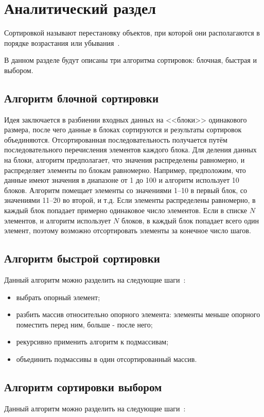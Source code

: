 \chapter{Аналитический раздел}

Сортировкой называют перестановку объектов, при которой они располагаются в порядке возрастания или убывания~\cite{knut}.

В данном разделе будут описаны три алгоритма сортировок: блочная, быстрая и выбором.

\section{Алгоритм блочной сортировки}
Идея заключается в разбиении входных данных на <<блоки>> одинакового размера, после чего данные в блоках сортируются и результаты сортировок объединяются.
Отсортированная последовательность получается путём последовательного перечисления элементов каждого блока.
Для деления данных на блоки, алгоритм предполагает, что значения распределены равномерно, и распределяет элементы по блокам равномерно. 
Например, предположим, что данные имеют значения в диапазоне от 1 до 100 и алгоритм использует 10 блоков. 
Алгоритм помещает элементы со значениями 1--10 в первый блок, со значениями 11--20  во второй, и т.д.
Если элементы распределены равномерно, в каждый блок попадает примерно одинаковое число элементов. 
Если в списке $N$ элементов, и алгоритм использует $N$ блоков, в каждый блок попадает всего один элемент, поэтому возможно отсортировать элементы за конечное число шагов.


\section{Алгоритм быстрой сортировки}
Данный алгоритм можно разделить на следующие шаги~\cite{quicksort}:

\begin{itemize}
	\item выбрать опорный элемент;
	\item разбить массив относительно опорного элемента: элементы меньше опорного поместить перед ним, больше - после него;
	\item рекурсивно применить алгоритм к подмассивам;
	\item объединить подмассивы в один отсортированный массив.
\end{itemize}


\section{Алгоритм сортировки выбором}
Данный алгоритм можно разделить на следующие шаги~\cite{selectionsort}:

